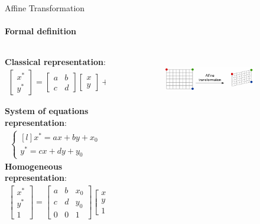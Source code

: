 \documentclass[aspectratio=169]{beamer}
\begin{document}
\begin{frame}[t]{Affine Transformation}
\framesubtitle{Formal definition}
\begin{columns}[T,onlytextwidth]
    \begin{column}{0.49\textwidth}
        \textbf{Classical representation}:\smallskip
    \begin{align*}
        \begin{bmatrix}x^*\\y^*\end{bmatrix} = \begin{bmatrix}
        a & b\\ 
        c & d 
        \end{bmatrix}\begin{bmatrix}x\\y\end{bmatrix} + \begin{bmatrix}x_0\\y_0\end{bmatrix}
    \end{align*} 

    \textbf{System of equations representation}:\smallskip
    \begin{align*}
        \left\{\begin{matrix*}[l]
        x^*=ax+by+x_0\\
        y^*=cx+dy+y_0 
        \end{matrix*}\right.
    \end{align*}
    \textbf{Homogeneous representation}:\smallskip
    \begin{align*}
        \begin{bmatrix}x^*\\y^*\\1\end{bmatrix}=\begin{bmatrix}
        a & b & x_0 \\
        c & d & y_0 \\ 
        0 & 0  & 1 
        \end{bmatrix}\begin{bmatrix}x\\y\\1\end{bmatrix}
    \end{align*}
    \end{column}
    \begin{column}{0.49\textwidth}
        \begin{figure}[H]
            \begin{subfigure}{0.99\textwidth}
                \centering\includegraphics[height=2cm,width=1\textwidth,keepaspectratio]{affine_eqn.png}
            \end{subfigure}


\end{figure}
\end{column}
\end{columns}
\end{frame}
\end{document}
